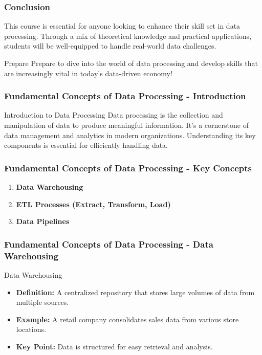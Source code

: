 \documentclass{beamer}
\begin{document}
\begin{frame}[fragile]
    \frametitle{Conclusion}
    This course is essential for anyone looking to enhance their skill set in data processing. Through a mix of theoretical knowledge and practical applications, students will be well-equipped to handle real-world data challenges.

    \begin{block}{Prepare}
    Prepare to dive into the world of data processing and develop skills that are increasingly vital in today's data-driven economy!
    \end{block}
\end{frame}

\begin{frame}[fragile]
    \frametitle{Fundamental Concepts of Data Processing - Introduction}
    \begin{block}{Introduction to Data Processing}
        Data processing is the collection and manipulation of data to produce meaningful information. It's a cornerstone of data management and analytics in modern organizations. Understanding its key components is essential for efficiently handling data.
    \end{block}
\end{frame}

\begin{frame}[fragile]
    \frametitle{Fundamental Concepts of Data Processing - Key Concepts}
    \begin{enumerate}
        \item \textbf{Data Warehousing}
        \item \textbf{ETL Processes (Extract, Transform, Load)}
        \item \textbf{Data Pipelines}
    \end{enumerate}
\end{frame}

\begin{frame}[fragile]
    \frametitle{Fundamental Concepts of Data Processing - Data Warehousing}
    \begin{block}{Data Warehousing}
        \begin{itemize}
            \item \textbf{Definition:} A centralized repository that stores large volumes of data from multiple sources. 
            \item \textbf{Example:} A retail company consolidates sales data from various store locations.
            \item \textbf{Key Point:} Data is structured for easy retrieval and analysis.
        \end{itemize}
    \end{block}
\end{frame}
\end{document}
